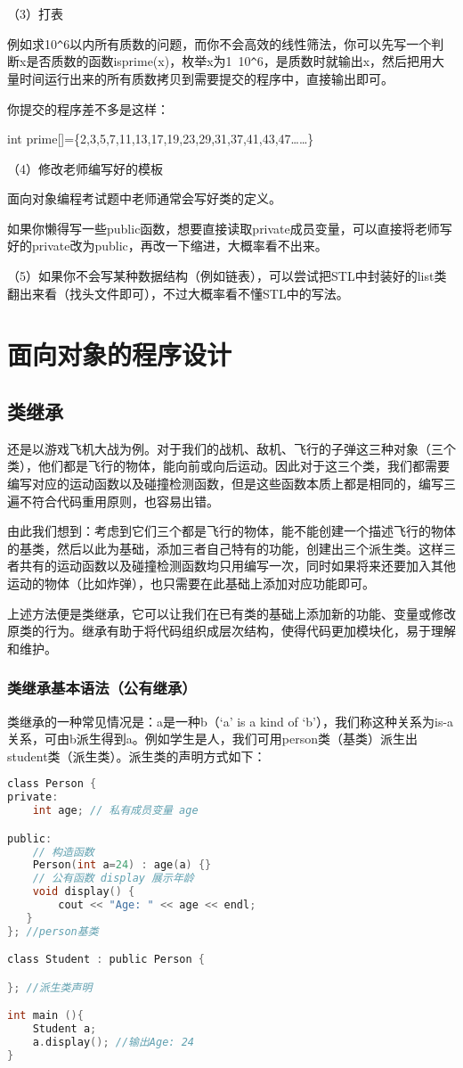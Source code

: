 \documentclass[UTF8]{ctexart}
\begin{document}
（3）打表

例如求10\verb|^|6以内所有质数的问题，而你不会高效的线性筛法，你可以先写一个判断x是否质数的函数isprime(x)，枚举x为1~10\verb|^|6，是质数时就输出x，然后把用大量时间运行出来的所有质数拷贝到需要提交的程序中，直接输出即可。

你提交的程序差不多是这样：

int prime[]=\{2,3,5,7,11,13,17,19,23,29,31,37,41,43,47……\}

（4）修改老师编写好的模板

面向对象编程考试题中老师通常会写好类的定义。

如果你懒得写一些public函数，想要直接读取private成员变量，可以直接将老师写好的private改为public，再改一下缩进，大概率看不出来。

（5）如果你不会写某种数据结构（例如链表），可以尝试把STL中封装好的list类翻出来看（找头文件即可），不过大概率看不懂STL中的写法。

\section{面向对象的程序设计}
\subsection{类继承}
还是以游戏飞机大战为例。对于我们的战机、敌机、飞行的子弹这三种对象（三个类），他们都是飞行的物体，能向前或向后运动。因此对于这三个类，我们都需要编写对应的运动函数以及碰撞检测函数，但是这些函数本质上都是相同的，编写三遍不符合代码重用原则，也容易出错。

由此我们想到：考虑到它们三个都是飞行的物体，能不能创建一个描述飞行的物体的基类，然后以此为基础，添加三者自己特有的功能，创建出三个派生类。这样三者共有的运动函数以及碰撞检测函数均只用编写一次，同时如果将来还要加入其他运动的物体（比如炸弹），也只需要在此基础上添加对应功能即可。

上述方法便是类继承，它可以让我们在已有类的基础上添加新的功能、变量或修改原类的行为。继承有助于将代码组织成层次结构，使得代码更加模块化，易于理解和维护。

\subsubsection{类继承基本语法（公有继承）}
类继承的一种常见情况是：a是一种b（‘a’ is a kind of ‘b’），我们称这种关系为is-a关系，可由b派生得到a。例如学生是人，我们可用person类（基类）派生出student类（派生类）。派生类的声明方式如下：
\begin{lstlisting}[language = C,basicstyle=\small\ttfamily]
class Person {
private:
    int age; // 私有成员变量 age

public:
    // 构造函数
    Person(int a=24) : age(a) {}
    // 公有函数 display 展示年龄
    void display() {
        cout << "Age: " << age << endl;
   }
}; //person基类

class Student : public Person {

}; //派生类声明

int main (){
    Student a;
    a.display(); //输出Age: 24
}
\end{lstlisting}
\end{document}

